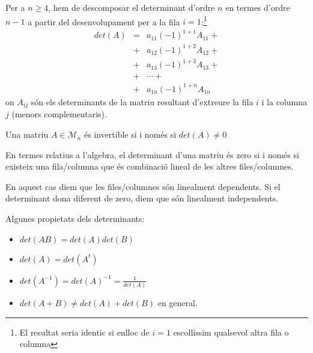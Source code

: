 \documentclass{beamer}
\begin{document}
\begin{frame}
  Per a $n \geq 4$, hem de descomposar el determinant d'ordre $n$ en termes d'ordre $n-1$ a partir del desenvolupament per a la fila $i=1$:\footnote{El resultat seria identic si enlloc de $i=1$ escollíssim qualsevol altra fila o columna}
  \begin{eqnarray}
  det(A)&=&a_{11}(-1)^{1+1}A_{11}+\\\nonumber
        &+& a_{12}(-1)^{1+2}A_{12}+\\\nonumber
        &+& a_{13}(-1)^{1+3}A_{13}+\\\nonumber
        &+& \cdots+\\\nonumber
        &+& a_{1n}(-1)^{1+n}A_{1n}
  \end{eqnarray}
  on $A_{ij}$ són els determinants de la matriu resultant d'extreure la fila $i$ i la columna $j$ (menors complementaris).
\end{frame}

\begin{frame}
  \begin{definicio}
    Una matriu $A\in \mathscr{M}_n$ és invertible si i només si $det(A) \neq 0$
  \end{definicio}
  En termes relatius a l'algebra, el determinant d'una matriu és zero si i només si existeix una fila/columna que és combinació lineal de les altres files/columnes.

  En aquest cas diem que les files/columnes són linealment dependents. Si el determinant dona diferent de zero, diem que són linealment independents.
\end{frame}
\begin{frame}
  Algunes propietats dels determinants:
  \begin{itemize}
    \item $det(AB)=det(A)det(B)$
    \item $det(A)=det(A^t)$
    \item $det(A^{-1})=det(A)^{-1}= \frac{1}{det(A)}$
    \item $det(A+B) \neq det(A)+det(B)$ en general.
  \end{itemize}
\end{frame}
\end{document}
